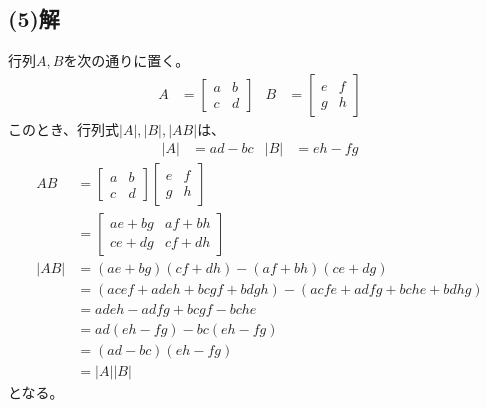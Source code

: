 \subsection{(5)解}
行列$A,B$を次の通りに置く。
\begin{align}
	A
&=
	\left[
	\begin{array}{cc}
		a & b \\
		c & d
	\end{array}
	\right] &
%
%
	B
&=
	\left[
	\begin{array}{cc}
		e & f \\
		g & h
	\end{array}
	\right]
\end{align}
このとき、行列式$|A|,|B|,|AB|$は、
\begin{align}
	|A|
&=
	ad-bc &
%
%
	|B|
&=
	eh-fg
\end{align}
\begin{align}
	AB
&=
	\left[
	\begin{array}{cc}
		a & b \\
		c & d
	\end{array}
	\right]
		\left[
		\begin{array}{cc}
			e & f \\
			g & h
		\end{array}
		\right] \\
%
%
&=
	\left[
	\begin{array}{cc}
		ae+bg & af+bh \\
		ce+dg & cf+dh
	\end{array}
	\right] \\
%
%
	|AB|
&=
	(ae+bg)(cf+dh)
	-
	(af+bh)(ce+dg) \\
%
%
&=
	(
		acef
		+
		adeh
		+
		bcgf
		+
		bdgh
	)
	-
	(
		acfe
		+
		adfg
		+
		bche
		+
		bdhg
	) \\
%
%
&=
	adeh
	-
	adfg
	+
	bcgf
	-
	bche \\
%
%
&=
	ad(eh-fg)
	-
	bc(eh-fg) \\
%
%
&=
	(ad-bc)(eh-fg) \\
%
%
&=
	|A||B|
\end{align}
となる。